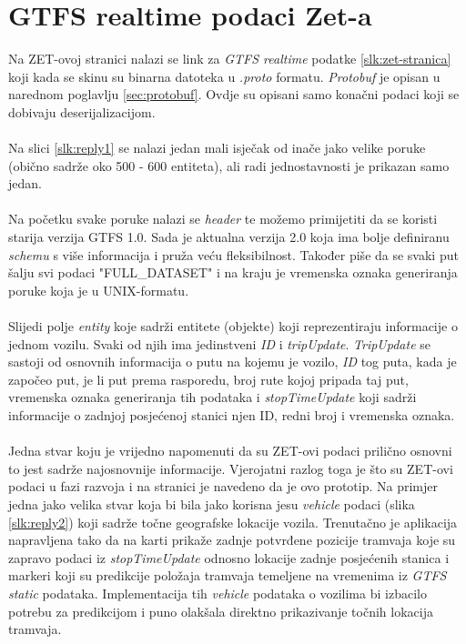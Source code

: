 \documentclass[zavrsnirad]{fer}
\begin{document}
\section{GTFS realtime podaci Zet-a}
Na ZET-ovoj stranici nalazi se link za \textit{GTFS realtime} podatke \ref{slk:zet-stranica} koji kada se skinu su binarna datoteka u \textit{.proto} formatu. \textit{Protobuf} je opisan u narednom poglavlju \ref{sec:protobuf}. Ovdje su opisani samo konačni podaci koji se dobivaju deserijalizacijom.\\\\
Na slici \ref{slk:reply1} se nalazi jedan mali isječak od inače jako velike poruke (obično sadrže oko 500 - 600 entiteta), ali radi jednostavnosti je prikazan samo jedan.\\\\
Na početku svake poruke nalazi se \textit{header} te možemo primijetiti da se koristi starija verzija GTFS 1.0. Sada je aktualna verzija 2.0 koja ima bolje definiranu \textit{schemu} s više informacija i pruža veću fleksibilnost. Također piše da se svaki put šalju svi podaci "FULL\_DATASET" i na kraju je vremenska oznaka generiranja poruke koja je u UNIX-formatu.\\\\
Slijedi polje \textit{entity} koje sadrži entitete (objekte) koji reprezentiraju informacije o jednom vozilu. Svaki od njih ima jedinstveni \textit{ID} i \textit{tripUpdate}. \textit{TripUpdate} se sastoji od osnovnih informacija o putu na kojemu je vozilo, \textit{ID} tog puta, kada je započeo put, je li put prema rasporedu, broj rute kojoj pripada taj put, vremenska oznaka generiranja tih podataka i \textit{stopTimeUpdate} koji sadrži informacije o zadnjoj posjećenoj stanici njen ID, redni broj i vremenska oznaka.\\\\
Jedna stvar koju je vrijedno napomenuti da su ZET-ovi podaci prilično osnovni to jest sadrže najosnovnije informacije. Vjerojatni razlog toga je što su ZET-ovi podaci u fazi razvoja i na stranici je navedeno da je ovo prototip. Na primjer jedna jako velika stvar koja bi bila jako korisna jesu \textit{vehicle} podaci (slika \ref{slk:reply2}) koji sadrže točne geografske lokacije vozila. Trenutačno je aplikacija napravljena tako da na karti prikaže zadnje potvrđene pozicije tramvaja koje su zapravo podaci iz \textit{stopTimeUpdate} odnosno lokacije zadnje posjećenih stanica i markeri koji su predikcije položaja tramvaja temeljene na vremenima iz \textit{GTFS static} podataka. Implementacija tih \textit{vehicle} podataka o vozilima bi izbacilo potrebu za predikcijom i puno olakšala direktno prikazivanje točnih lokacija tramvaja.
\end{document}
